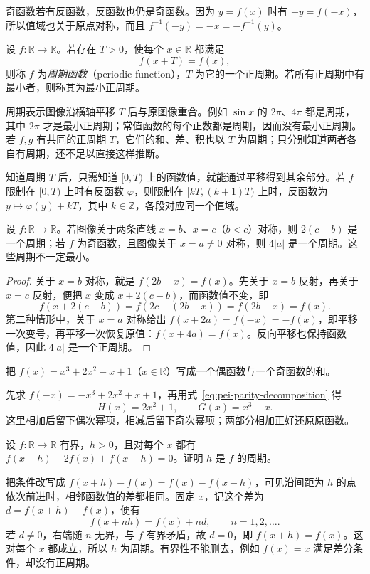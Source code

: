 奇函数若有反函数，反函数也仍是奇函数。因为 $y=f(x)$ 时有 $-y=f(-x)$，所以值域也关于原点对称，而且 $f^{-1}(-y)=-x=-f^{-1}(y)$。

\begin{definition}
\label{def:pei-period}
设 $f:\mathbb R\to\mathbb R$。若存在 $T>0$，使每个 $x\in\mathbb R$ 都满足
\[
    f(x+T)=f(x),
\]
则称 $f$ 为\emph{周期函数}（periodic function），$T$ 为它的一个正周期。若所有正周期中有最小者，则称其为最小正周期。
\end{definition}

周期表示图像沿横轴平移 $T$ 后与原图像重合。例如 $\sin x$ 的 $2\pi$、$4\pi$ 都是周期，其中 $2\pi$ 才是最小正周期；常值函数的每个正数都是周期，因而没有最小正周期。若 $f,g$ 有共同的正周期 $T$，它们的和、差、积也以 $T$ 为周期；只分别知道两者各自有周期，还不足以直接这样推断。

知道周期 $T$ 后，只需知道 $[0,T)$ 上的函数值，就能通过平移得到其余部分。若 $f$ 限制在 $[0,T)$ 上时有反函数 $\varphi$，则限制在 $[kT,(k+1)T)$ 上时，反函数为 $y\mapsto\varphi(y)+kT$，其中 $k\in\mathbb Z$，各段对应同一个值域。

\begin{proposition}[由图像对称找周期]
\label{prop:pei-symmetry-period}
设 $f:\mathbb R\to\mathbb R$。若图像关于两条直线 $x=b$、$x=c$（$b<c$）对称，则 $2(c-b)$ 是一个周期；若 $f$ 为奇函数，且图像关于 $x=a\ne0$ 对称，则 $4|a|$ 是一个周期。这些周期不一定最小。
\end{proposition}
\begin{proof}
关于 $x=b$ 对称，就是 $f(2b-x)=f(x)$。先关于 $x=b$ 反射，再关于 $x=c$ 反射，便把 $x$ 变成 $x+2(c-b)$，而函数值不变，即
\[
    f(x+2(c-b))=f(2c-(2b-x))=f(2b-x)=f(x).
\]
第二种情形中，关于 $x=a$ 对称给出 $f(x+2a)=f(-x)=-f(x)$，即平移一次变号，再平移一次恢复原值：$f(x+4a)=f(x)$。反向平移也保持函数值，因此 $4|a|$ 是一个正周期。
\end{proof}

\begin{example}
\label{ex:pei-parity-split}
把 $f(x)=x^3+2x^2-x+1$（$x\in\mathbb R$）写成一个偶函数与一个奇函数的和。
\end{example}
\begin{solve}
先求 $f(-x)=-x^3+2x^2+x+1$，再用式~\eqref{eq:pei-parity-decomposition} 得
\[
    H(x)=2x^2+1,\qquad G(x)=x^3-x.
\]
这里相加后留下偶次幂项，相减后留下奇次幂项；两部分相加正好还原原函数。
\end{solve}

\begin{example}
\label{ex:pei-bounded-second-difference}
设 $f:\mathbb R\to\mathbb R$ 有界，$h>0$，且对每个 $x$ 都有 $f(x+h)-2f(x)+f(x-h)=0$。证明 $h$ 是 $f$ 的周期。
\end{example}
\begin{solve}
把条件改写成 $f(x+h)-f(x)=f(x)-f(x-h)$，可见沿间距为 $h$ 的点依次前进时，相邻函数值的差都相同。固定 $x$，记这个差为 $d=f(x+h)-f(x)$，便有
\[
    f(x+nh)=f(x)+nd,\qquad n=1,2,\ldots.
\]
若 $d\ne0$，右端随 $n$ 无界，与 $f$ 有界矛盾，故 $d=0$，即 $f(x+h)=f(x)$。这对每个 $x$ 都成立，所以 $h$ 为周期。有界性不能删去，例如 $f(x)=x$ 满足差分条件，却没有正周期。
\end{solve}

